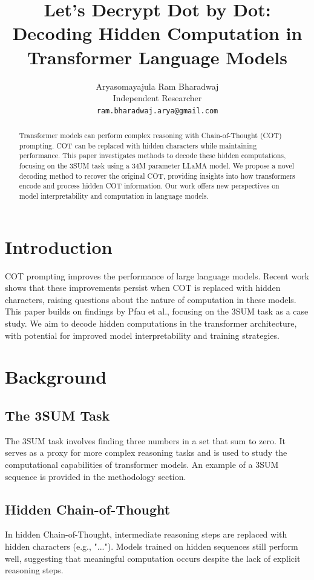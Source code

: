 \documentclass[10pt,a4paper]{article}
\title{Let's Decrypt Dot by Dot: Decoding Hidden Computation in Transformer Language Models}
\author{Aryasomayajula Ram Bharadwaj\\
Independent Researcher\\
\texttt{ram.bharadwaj.arya@gmail.com}}
\begin{document}
\maketitle

\begin{abstract}
Transformer models can perform complex reasoning with Chain-of-Thought (COT) prompting. COT can be replaced with hidden characters while maintaining performance. This paper investigates methods to decode these hidden computations, focusing on the 3SUM task using a 34M parameter LLaMA model. We propose a novel decoding method to recover the original COT, providing insights into how transformers encode and process hidden COT information. Our work offers new perspectives on model interpretability and computation in language models.
\end{abstract}

\section{Introduction}
COT prompting improves the performance of large language models\cite{2}. Recent work shows that these improvements persist when COT is replaced with hidden characters, raising questions about the nature of computation in these models\cite{1}. This paper builds on findings by Pfau et al., focusing on the 3SUM task as a case study. We aim to decode hidden computations in the transformer architecture, with potential for improved model interpretability and training strategies.

\section{Background}

\subsection{The 3SUM Task}
The 3SUM task involves finding three numbers in a set that sum to zero. It serves as a proxy for more complex reasoning tasks and is used to study the computational capabilities of transformer models\cite{3}. An example of a 3SUM sequence is provided in the methodology section.

\subsection{Hidden Chain-of-Thought}
In hidden Chain-of-Thought, intermediate reasoning steps are replaced with hidden characters (e.g., "..."). Models trained on hidden sequences still perform well, suggesting that meaningful computation occurs despite the lack of explicit reasoning steps\cite{1}.
\end{document}
